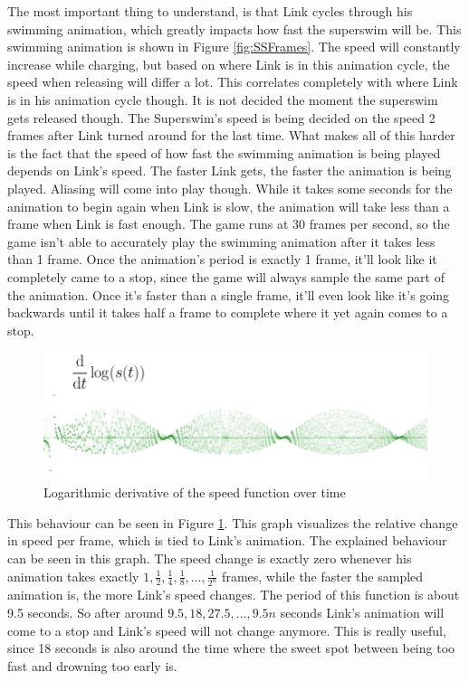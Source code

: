 \documentclass[titlepage,12pt,a4paper]{article}
\begin{document}
The most important thing to understand, is that Link cycles through his swimming animation, which greatly impacts how fast the superswim will be. This swimming animation is shown in Figure \ref{fig:SSFrames}. The speed will constantly increase while charging, but based on where Link is in this animation cycle, the speed when releasing will differ a lot. This correlates completely with where Link is in his animation cycle though. It is not decided the moment the superswim gets released though. The Superswim's speed is being decided on the speed 2 frames after Link turned around for the last time. What makes all of this harder is the fact that the speed of how fast the swimming animation is being played depends on Link's speed. The faster Link gets, the faster the animation is being played. Aliasing will come into play though. While it takes some seconds for the animation to begin again when Link is slow, the animation will take less than a frame when Link is fast enough. The game runs at 30 frames per second, so the game isn't able to accurately play the swimming animation after it takes less than 1 frame. Once the animation's period is exactly 1 frame, it'll look like it completely came to a stop, since the game will always sample the same part of the animation. Once it's faster than a single frame, it'll even look like it's going backwards until it takes half a frame to complete where it yet again comes to a stop.  

\begin{figure}[!htb]
	\centering
	\includegraphics[width=\textwidth]{SSDerivative}
	\caption{Logarithmic derivative of the speed function over time}
	\label{fig:SSDerivative}
\end{figure}

This behaviour can be seen in Figure \ref{fig:SSDerivative}. This graph visualizes the relative change in speed per frame, which is tied to Link's animation. The explained behaviour can be seen in this graph. The speed change is exactly zero whenever his animation takes exactly $1, \frac{1}{2}, \frac{1}{4}, \frac{1}{8}, \ldots, \frac{1}{2^n}$ frames, while the faster the sampled animation is, the more Link's speed changes. The period of this function is about 9.5 seconds. So after around $9.5, 18, 27.5, \ldots, 9.5 n$ seconds Link's animation will come to a stop and Link's speed will not change anymore. This is really useful, since 18 seconds is also around the time where the sweet spot between being too fast and drowning too early is.
\end{document}
